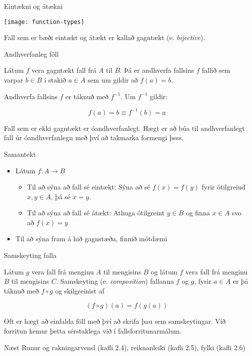 \documentclass[handout]{beamer}
\begin{document}
\begin{frame}{Eintækni og átækni}
\begin{center}
\texttt{[image: function-types]}
\end{center}
Fall sem er bæði eintækt og átækt er kallað gagntækt (e. \emph{bijective}).
\end{frame}

\begin{frame}{Andhverfanleg föll}
\begin{tcolorbox}[title=Andhverfanlegt fall]
Látum $f$ vera gagntækt fall frá $A$ til $B$. Þá er andhverfa fallsins $f$ fallið sem varpar $b \in B$ í stakið $a \in A$ sem um gildir að $f(a) = b$.

Andhverfa fallsins $f$ er táknuð með $f^{-1}$. Um $f^{-1}$ gildir:

\[
 f(a) = b \equiv f^{-1}(b) = a
\]

\end{tcolorbox}
Fall sem er ekki gagntækt er óandhverfanlegt. Hægt er að búa til andhverfanlegt fall úr óandhverfanlegu með því að takmarka formengi þess.
\end{frame}

\begin{frame}{Samantekt}
\begin{itemize}
 \item Látum $f: A \to B$
 \begin{itemize}
  \item Til að sýna að fall sé eintækt: Sýna að sé $f(x) = f(y)$ fyrir ótilgreind $x, y \in A$, þá sé $x = y$.
  \item Til að sýna að fall sé átækt: Athuga ótilgreint $y \in B$ og finna $x \in A$ svo að $f(x) = y$
 \end{itemize}
 \item Til að sýna fram á hið gagnstæða, finnið mótdæmi
\end{itemize}

\end{frame}


\begin{frame}{Samskeyting falla}
\begin{tcolorbox}[title=Samskeyting falla]
Látum $g$ vera fall frá menginu $A$ til mengisins $B$ og látum $f$ vera fall frá menginu $B$ til mengisins $C$. Samskeyting (e. \emph{composition}) fallanna $f$ og $g$, fyrir $a \in A$ er þá táknuð með $f \circ g$ og skilgreinist af

\[
 (f \circ g)(a) = f(g(a))
\]

\end{tcolorbox}
Oft er hægt að einfalda föll með því að skrifa þau sem samskeytingar. Við forritun kemur þetta sérstaklega við í fallsforritunarmálum.
\end{frame}

\begin{frame}{Næst}
Runur og rakningarvensl (kafli 2.4), reiknanleiki (kafli 2.5), fylki (kafli 2.6)
\end{frame}
\end{document}
